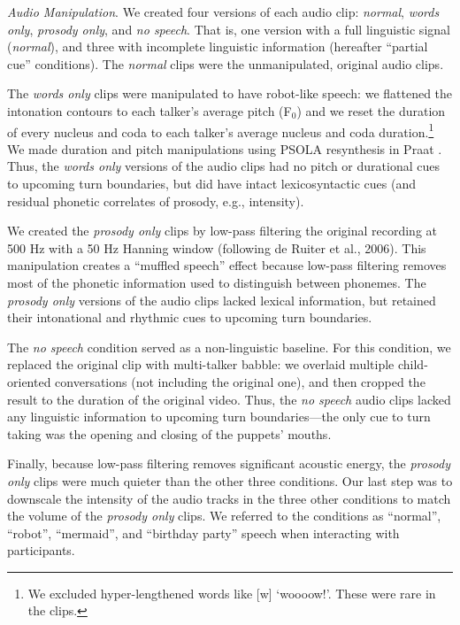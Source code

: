 \documentclass[authoryear, 12pt]{elsarticle}
\begin{document}
\textit{Audio Manipulation}. We created four versions of each audio clip: \textit{normal}, \textit{words only}, \textit{prosody only}, and \textit{no speech}. That is, one version with a full linguistic signal (\textit{normal}), and three with incomplete linguistic information (hereafter ``partial cue'' conditions). The \textit{normal} clips were the unmanipulated, original audio clips. 

The \textit{words only} clips were manipulated to have robot-like speech: we flattened the intonation contours to each talker's average pitch (F$_{0}$) and we reset the duration of every nucleus and coda to each talker's average nucleus and coda duration.\footnote{We excluded hyper-lengthened words like [w] `woooow!'. These were rare in the clips.} We made duration and pitch manipulations using PSOLA resynthesis in Praat \citep{Praat}. Thus, the \textit{words only} versions of the audio clips had no pitch or durational cues to upcoming turn boundaries, but did have intact lexicosyntactic cues (and residual phonetic correlates of prosody, e.g., intensity). 

We created the \textit{prosody only} clips by low-pass filtering the original recording at 500 Hz with a 50 Hz Hanning window (following de Ruiter et al., 2006). This manipulation creates a ``muffled speech'' effect because low-pass filtering removes most of the phonetic information used to distinguish between phonemes. The \textit{prosody only} versions of the audio clips lacked lexical information, but retained their intonational and rhythmic cues to upcoming turn boundaries. 

The \textit{no speech} condition served as a non-linguistic baseline. For this condition, we replaced the original clip with multi-talker babble: we overlaid multiple child-oriented conversations (not including the original one), and then cropped the result to the duration of the original video. Thus, the \textit{no speech} audio clips lacked any linguistic information to upcoming turn boundaries---the only cue to turn taking was the opening and closing of the puppets' mouths. 

Finally, because low-pass filtering removes significant acoustic energy, the \textit{prosody only} clips were much quieter than the other three conditions. Our last step was to downscale the intensity of the audio tracks in the three other conditions to match the volume of the \textit{prosody only} clips. We referred to the conditions as ``normal'', ``robot'', ``mermaid'', and ``birthday party'' speech when interacting with participants.
\end{document}
